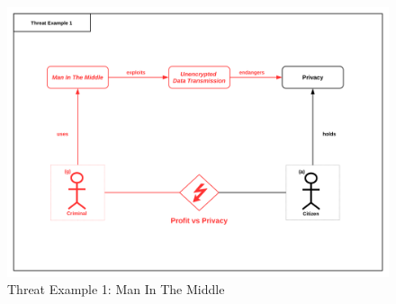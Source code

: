 \begin{figure}
\centering
\includegraphics[width=\textwidth]{diagrams/png/man-in-the-middle.png}


\caption{Threat Example 1: Man In The Middle}
\label{figure:Threat Example 1: Man In The Middle}
\end{figure}
